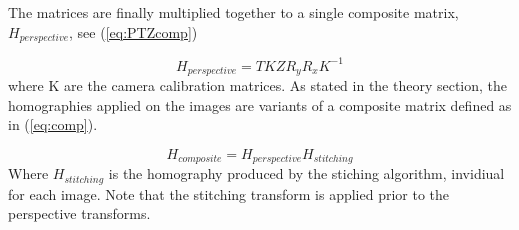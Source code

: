 	The matrices are finally multiplied together to a single composite matrix, $H_{perspective}$, see (\ref{eq:PTZcomp})

	\begin{equation}
		H_{perspective}=TKZR_yR_xK^{-1}
		\label{eq:PTZcomp}
	\end{equation}
	where K are the camera calibration matrices.
	As stated in the theory section, the homographies applied on the images are variants of a composite matrix defined as in (\ref{eq:comp}).

	\begin{equation}
		H_{composite}=H_{perspective}H_{stitching}
		\label{eq:comp}
	\end{equation}
	Where $H_{stitching}$ is the homography produced by the stiching algorithm, invidiual for each image. Note that the stitching transform is applied prior to the perspective transforms. %

